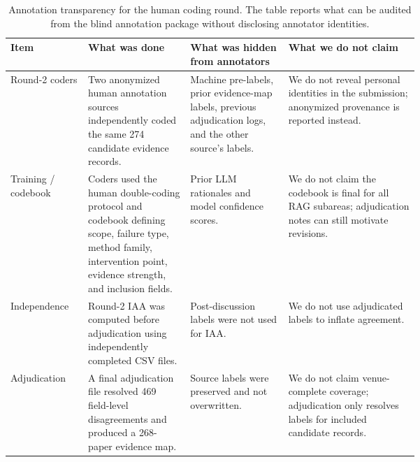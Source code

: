 \begin{table}[t]
\centering
\scriptsize
\renewcommand{\arraystretch}{0.9}
\begin{tabularx}{\linewidth}{>{\raggedright\arraybackslash}p{0.19\linewidth}>{\raggedright\arraybackslash}p{0.25\linewidth}>{\raggedright\arraybackslash}p{0.24\linewidth}X}
\toprule
\textbf{Item} & \textbf{What was done} & \textbf{What was hidden from annotators} & \textbf{What we do not claim} \\
\midrule
Round-2 coders & Two anonymized human annotation sources independently coded the same 274 candidate evidence records. & Machine pre-labels, prior evidence-map labels, previous adjudication logs, and the other source's labels. & We do not reveal personal identities in the submission; anonymized provenance is reported instead. \\
Training / codebook & Coders used the human double-coding protocol and codebook defining scope, failure type, method family, intervention point, evidence strength, and inclusion fields. & Prior LLM rationales and model confidence scores. & We do not claim the codebook is final for all RAG subareas; adjudication notes can still motivate revisions. \\
Independence & Round-2 IAA was computed before adjudication using independently completed CSV files. & Post-discussion labels were not used for IAA. & We do not use adjudicated labels to inflate agreement. \\
Adjudication & A final adjudication file resolved 469 field-level disagreements and produced a 268-paper evidence map. & Source labels were preserved and not overwritten. & We do not claim venue-complete coverage; adjudication only resolves labels for included candidate records. \\
\bottomrule
\end{tabularx}
\caption{Annotation transparency for the human coding round. The table reports what can be audited from the blind annotation package without disclosing annotator identities.}
\label{tab:annotation-transparency}
\end{table}

